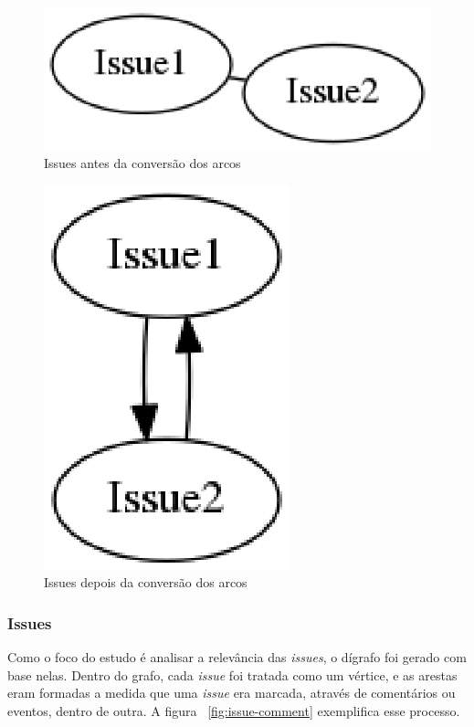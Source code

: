 \begin{figure}[h]
    \centering
        \includegraphics[keepaspectratio=true,scale=0.5]{figuras/undirected.eps}
    \caption{Issues antes da conversão dos arcos}
    \label{fig:undirected}
\end{figure}

\begin{figure}[h]
    \centering
        \includegraphics[keepaspectratio=true,scale=0.5]{figuras/directed.eps}
    \caption{Issues depois da conversão dos arcos}
    \label{fig:directed}
\end{figure}

\newpage
\subsubsection{Issues}
\label{est:ran:ver}

Como o foco do estudo é analisar a relevância das \textit{issues}, o dígrafo 
foi gerado com base nelas. Dentro do grafo, cada \textit{issue} foi tratada
como um vértice, e as arestas eram formadas a medida que uma \textit{issue}
era marcada, através de comentários ou eventos, dentro de outra. A figura
~\ref{fig:issue-comment} exemplifica esse processo.

